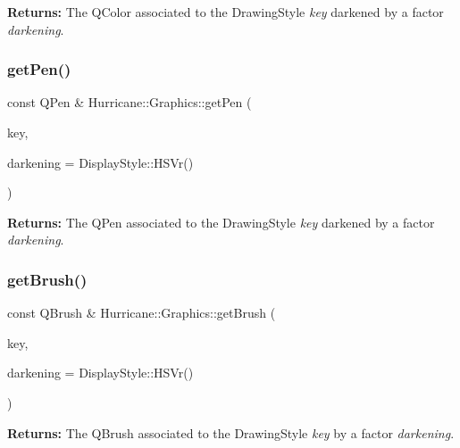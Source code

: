 {\bfseries Returns\+:} The Q\+Color associated to the Drawing\+Style {\itshape key} darkened by a factor {\itshape darkening}. \mbox{\label{classHurricane_1_1Graphics_a0197c915f8d76c3798cf19ea2d878834}} 
\subsubsection{\texorpdfstring{get\+Pen()}{getPen()}}
{\footnotesize\ttfamily const Q\+Pen \& Hurricane\+::\+Graphics\+::get\+Pen (\begin{DoxyParamCaption}\item[{const \textbf{ Name} \&}]{key,  }\item[{const Display\+Style\+::\+H\+S\+Vr \&}]{darkening = {\ttfamily DisplayStyle\+:\+:HSVr()} }\end{DoxyParamCaption})\hspace{0.3cm}{\ttfamily [static]}}

{\bfseries Returns\+:} The Q\+Pen associated to the Drawing\+Style {\itshape key} darkened by a factor {\itshape darkening}. \mbox{\label{classHurricane_1_1Graphics_ad67a43df460d5c5d5179a81d2a72c9a9}} 
\subsubsection{\texorpdfstring{get\+Brush()}{getBrush()}}
{\footnotesize\ttfamily const Q\+Brush \& Hurricane\+::\+Graphics\+::get\+Brush (\begin{DoxyParamCaption}\item[{const \textbf{ Name} \&}]{key,  }\item[{const Display\+Style\+::\+H\+S\+Vr \&}]{darkening = {\ttfamily DisplayStyle\+:\+:HSVr()} }\end{DoxyParamCaption})\hspace{0.3cm}{\ttfamily [static]}}

{\bfseries Returns\+:} The Q\+Brush associated to the Drawing\+Style {\itshape key} by a factor {\itshape darkening}. \mbox{\label{classHurricane_1_1Graphics_a08111e942b095327fa6031dca7c96e8e}} 

